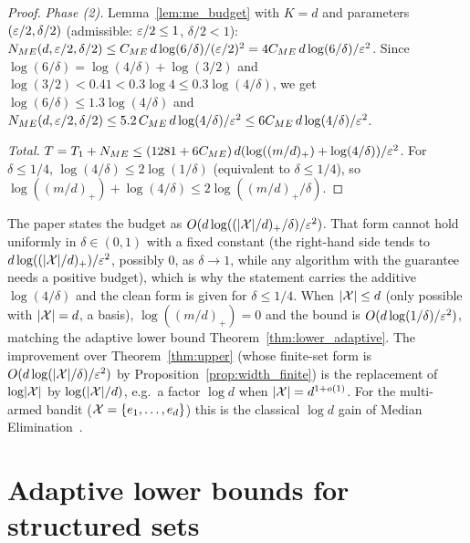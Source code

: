 \begin{proof}
\emph{Phase (2).} Lemma~\ref{lem:me_budget} with $K = d$ and parameters $(\varepsilon/2,\delta/2)$
(admissible: $\varepsilon/2 \le 1$, $\delta/2 < 1$):
$N_{ME}(d,\varepsilon/2,\delta/2) \le C_{ME}\,d\log(6/\delta)/(\varepsilon/2)^2 = 4C_{ME}\,d\log(6/\delta)/\varepsilon^2$.
Since $\log(6/\delta) = \log(4/\delta) + \log(3/2)$ and $\log(3/2) < 0.41 < 0.3\log 4 \le 0.3\log(4/\delta)$,
we get $\log(6/\delta) \le 1.3\log(4/\delta)$ and
$N_{ME}(d,\varepsilon/2,\delta/2) \le 5.2\,C_{ME}\,d\log(4/\delta)/\varepsilon^2 \le 6C_{ME}\,d\log(4/\delta)/\varepsilon^2$.

\emph{Total.} $T = T_1 + N_{ME} \le (1281 + 6C_{ME})\,d(\log((m/d)_+) + \log(4/\delta))/\varepsilon^2$.
For $\delta \le 1/4$, $\log(4/\delta) \le 2\log(1/\delta)$ (equivalent to $\delta \le 1/4$),
so $\log((m/d)_+) + \log(4/\delta) \le 2\log((m/d)_+/\delta)$.
\end{proof}

\begin{remark}
The paper states the budget as $O(d\log((\lvert \mathcal{X} \rvert/d)_+/\delta)/\varepsilon^2)$. That form cannot
hold uniformly in $\delta \in (0,1)$ with a fixed constant (the right-hand side tends to
$d\log((\lvert \mathcal{X} \rvert/d)_+)/\varepsilon^2$, possibly $0$, as $\delta \to 1$, while any algorithm with the
guarantee needs a positive budget), which is why the statement carries the additive
$\log(4/\delta)$ and the clean form is given for $\delta \le 1/4$. When $\lvert \mathcal{X} \rvert \le d$
(only possible with $\lvert \mathcal{X} \rvert = d$, a basis), $\log((m/d)_+) = 0$ and the bound is
$O(d\log(1/\delta)/\varepsilon^2)$, matching the adaptive lower bound
Theorem~\ref{thm:lower_adaptive}. The improvement over Theorem~\ref{thm:upper} (whose
finite-set form is $O(d\log(\lvert \mathcal{X} \rvert/\delta)/\varepsilon^2)$ by Proposition~\ref{prop:width_finite})
is the replacement of $\log\lvert \mathcal{X} \rvert$ by $\log(\lvert \mathcal{X} \rvert/d)$, e.g.\ a factor $\log d$ when
$\lvert \mathcal{X} \rvert = d^{1+o(1)}$. For the multi-armed bandit ($\mathcal{X} = \{e_1,\dots,e_d\}$) this is the
classical $\log d$ gain of Median Elimination~\cite{even2002pac}.
\end{remark}

\section{Adaptive lower bounds for structured sets}
\label{sec:log_gains_lower}

